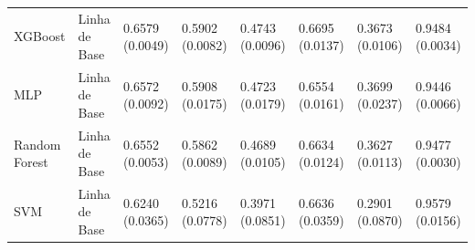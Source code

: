 \begin{table}[H]
{\begin{tabular}{llllllll}
      XGBoost & Linha de Base & 0.6579 (0.0049) & 0.5902 (0.0082) & 0.4743 (0.0096) & 0.6695 (0.0137) & 0.3673 (0.0106) & 0.9484 (0.0034) \\
      MLP & Linha de Base & 0.6572 (0.0092) & 0.5908 (0.0175) & 0.4723 (0.0179) & 0.6554 (0.0161) & 0.3699 (0.0237) & 0.9446 (0.0066) \\
      Random Forest & Linha de Base & 0.6552 (0.0053) & 0.5862 (0.0089) & 0.4689 (0.0105) & 0.6634 (0.0124) & 0.3627 (0.0113) & 0.9477 (0.0030) \\
      SVM & Linha de Base & 0.6240 (0.0365) & 0.5216 (0.0778) & 0.3971 (0.0851) & 0.6636 (0.0359) & 0.2901 (0.0870) & 0.9579 (0.0156) \\
      \bottomrule
    \end{tabular}
  }

\end{table}


